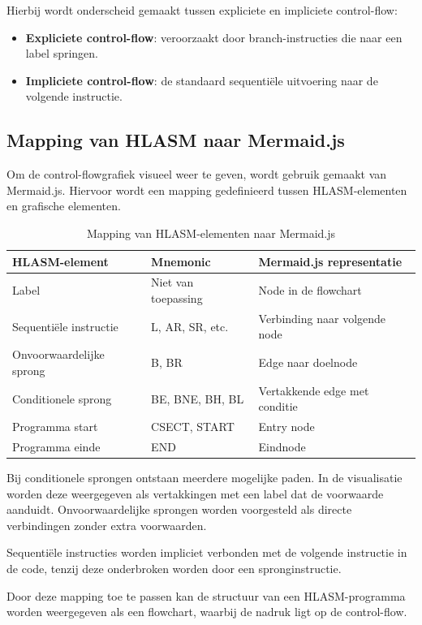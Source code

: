 \newpage

Hierbij wordt onderscheid gemaakt tussen expliciete en impliciete control-flow:

\begin{itemize}
    \item \textbf{Expliciete control-flow}: veroorzaakt door branch-instructies die naar een label springen.
    \item \textbf{Impliciete control-flow}: de standaard sequentiële uitvoering naar de volgende instructie.
\end{itemize}

\subsection{Mapping van HLASM naar Mermaid.js}

Om de control-flowgrafiek visueel weer te geven, wordt gebruik gemaakt van Mermaid.js. Hiervoor wordt een mapping gedefinieerd tussen HLASM-elementen en grafische elementen.

\begin{table}[h!]
    \centering
    \small
    \begin{tabular}{|p{3.5cm}|p{3.5cm}|p{5cm}|}
        \hline
        \textbf{HLASM-element} & \textbf{Mnemonic} & \textbf{Mermaid.js representatie} \\
        \hline
        Label & Niet van toepassing & Node in de flowchart \\
        \hline
        Sequentiële instructie & L, AR, SR, etc. & Verbinding naar volgende node \\
        \hline
        Onvoorwaardelijke sprong & B, BR & Edge naar doelnode \\
        \hline
        Conditionele sprong & BE, BNE, BH, BL & Vertakkende edge met conditie \\
        \hline
        Programma start & CSECT, START & Entry node \\
        \hline
        Programma einde & END & Eindnode \\
        \hline
    \end{tabular}
    \caption{Mapping van HLASM-elementen naar Mermaid.js}
    \label{tab:mapping_hlasm_mermaid}
\end{table}

Bij conditionele sprongen ontstaan meerdere mogelijke paden. In de visualisatie worden deze weergegeven als vertakkingen met een label dat de voorwaarde aanduidt. Onvoorwaardelijke sprongen worden voorgesteld als directe verbindingen zonder extra voorwaarden.

Sequentiële instructies worden impliciet verbonden met de volgende instructie in de code, tenzij deze onderbroken worden door een spronginstructie.

Door deze mapping toe te passen kan de structuur van een HLASM-programma worden weergegeven als een flowchart, waarbij de nadruk ligt op de control-flow.


